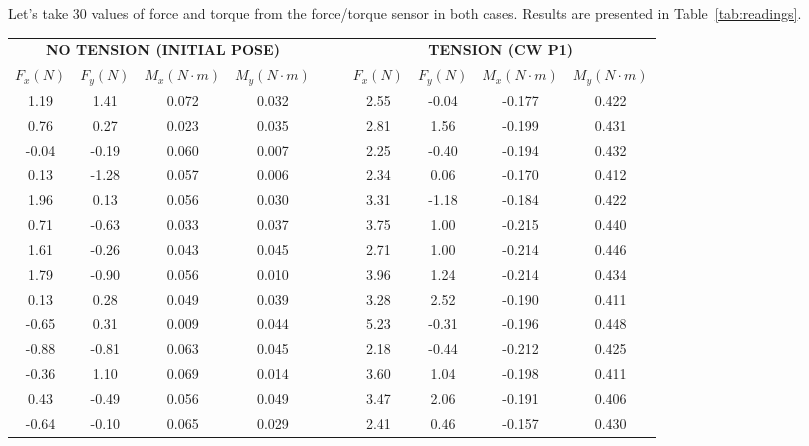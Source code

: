Let's take 30 values of force and torque from the force/torque sensor in both cases. Results are presented in Table~\ref{tab:readings}.%
\setlength\LTpost{0pt}
\begin{longtable}{|c|c|c|c|rr|c|c|c|c|}
		\cmidrule{1-4}\cmidrule{7-10}    \multicolumn{4}{|c|}{\textbf{NO TENSION (INITIAL POSE)}} &       &       & \multicolumn{4}{c|}{\textbf{TENSION (CW P1)}} \\
		\cmidrule{1-4}\cmidrule{7-10}    \textbf{$F_{x} (N)$} & \textbf{$F_{y} (N)$} & \textbf{$M_{x} (N \cdot m)$} & \textbf{$M_{y} (N \cdot m)$} &       &       & \textbf{$F_{x} (N)$} & \textbf{$F_{y} (N)$} & \textbf{$M_{x} (N \cdot m)$} & \textbf{$M_{y} (N \cdot m)$} \\
		\cmidrule{1-4}\cmidrule{7-10}    1.19  & 1.41  & 0.072 & 0.032 &       &       & 2.55  & -0.04 & -0.177 & 0.422 \\
		0.76  & 0.27  & 0.023 & 0.035 &       &       & 2.81  & 1.56  & -0.199 & 0.431 \\
		-0.04 & -0.19 & 0.060 & 0.007 &       &       & 2.25  & -0.40 & -0.194 & 0.432 \\
		0.13  & -1.28 & 0.057 & 0.006 &       &       & 2.34  & 0.06  & -0.170 & 0.412 \\
		1.96  & 0.13  & 0.056 & 0.030 &       &       & 3.31  & -1.18 & -0.184 & 0.422 \\
		0.71  & -0.63 & 0.033 & 0.037 &       &       & 3.75  & 1.00  & -0.215 & 0.440 \\
		1.61  & -0.26 & 0.043 & 0.045 &       &       & 2.71  & 1.00  & -0.214 & 0.446 \\
		1.79  & -0.90 & 0.056 & 0.010 &       &       & 3.96  & 1.24  & -0.214 & 0.434 \\
		0.13  & 0.28  & 0.049 & 0.039 &       &       & 3.28  & 2.52  & -0.190 & 0.411 \\
		-0.65 & 0.31  & 0.009 & 0.044 &       &       & 5.23  & -0.31 & -0.196 & 0.448 \\
		-0.88 & -0.81 & 0.063 & 0.045 &       &       & 2.18  & -0.44 & -0.212 & 0.425 \\
		-0.36 & 1.10  & 0.069 & 0.014 &       &       & 3.60  & 1.04  & -0.198 & 0.411 \\
		0.43  & -0.49 & 0.056 & 0.049 &       &       & 3.47  & 2.06  & -0.191 & 0.406 \\
		-0.64 & -0.10 & 0.065 & 0.029 &       &       & 2.41  & 0.46  & -0.157 & 0.430 \\

\end{longtable}
